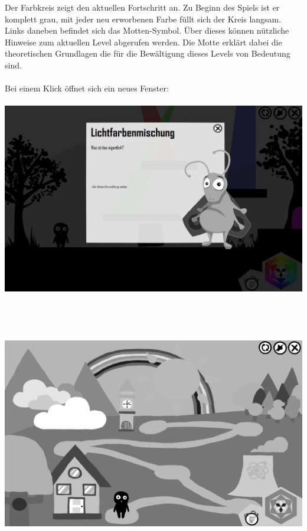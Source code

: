 \documentclass[10pt,a4paper,notitlepage]{report}
\begin{document}
	Der Farbkreis zeigt den aktuellen Fortschritt an. Zu Beginn des Spiels ist er komplett grau, mit jeder neu erworbenen Farbe füllt sich der Kreis langsam.\\
	Links daneben befindet sich das Motten-Symbol. Über dieses können nützliche Hinweise zum aktuellen Level abgerufen werden. Die Motte erklärt dabei die 		theoretischen Grundlagen die für die Bewältigung dieses Levels von Bedeutung sind.\\\\
	Bei einem Klick öffnet sich ein neues Fenster:\\\\
	\includegraphics[width=1\textwidth]{png/screen_help.png}\ 
	\\
	\clearpage\
	\\
	\\
	\\
	\includegraphics[width=1\textwidth]{png/screen_overview.png}\
	\\\\
\end{document}
